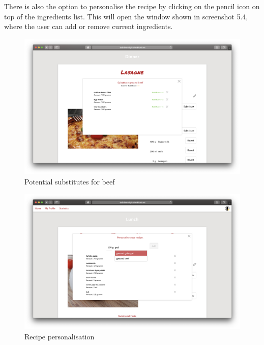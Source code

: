 There is also the option to personalise the recipe by clicking on the pencil icon on top of the ingredients list. This will open the window shown in screenshot 5.4, where the user can add or remove current ingredients.

\vspace{-1em}
\begin{figure}[H]
	\captionsetup{justification=centering}
	\begin{center}
		\includegraphics[scale=0.28]{Ressourcen/img/screenshots/screenshotJ.png}
		\vspace{-3em}
		\caption{Potential substitutes for beef}
	\end{center}
\end{figure}

\vspace{-2em}
\begin{figure}[H]
	\captionsetup{justification=centering}
	\begin{center}
		\includegraphics[scale=0.28]{Ressourcen/img/screenshots/screenshotK.png}
		\vspace{-3em}
		\caption{Recipe personalisation}
	\end{center}
\end{figure}

